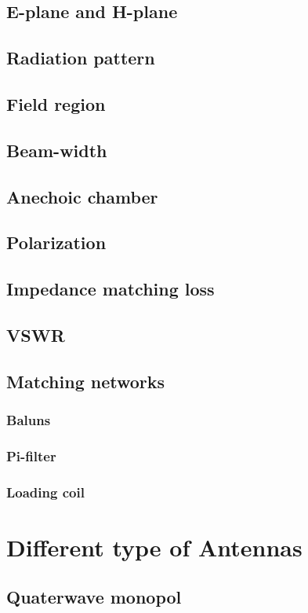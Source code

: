 \subsection{E-plane and H-plane}

\subsection{Radiation pattern}
\subsection{Field region}
\subsection{Beam-width}
\subsection{Anechoic chamber}
\subsection{Polarization}
\subsection{Impedance matching loss}
\subsection{VSWR}
\subsection{Matching networks}
\subsubsection{Baluns}
\subsubsection{Pi-filter}
\subsubsection{Loading coil}
\section{Different type of Antennas}
\subsection{Quaterwave monopol}
